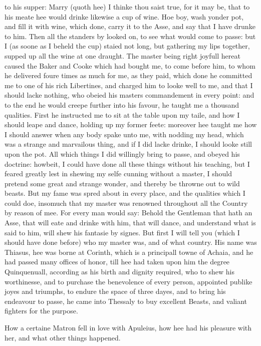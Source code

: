 to his supper: Marry (quoth hee) I thinke thou saist true, for it may be, that
to his meate hee would drinke likewise a cup of wine. Hoe boy, wash yonder pot,
and fill it with wine, which done, carry it to the Asse, and say that I have
drunke to him. Then all the standers by looked on, to see what would come to
passe: but I (as soone as I beheld the cup) staied not long, but gathering my
lips together, supped up all the wine at one draught. The master being right
joyfull hereat caused the Baker and Cooke which had bought me, to come before
him, to whom he delivered foure times as much for me, as they paid, which done
he committed me to one of his rich Libertines, and charged him to looke well to
me, and that I should lacke nothing, who obeied his masters commandement in
every point: and to the end he would creepe further into his favour, he taught
me a thousand qualities. First he instructed me to sit at the table upon my
taile, and how I should leape and dance, holding up my former feete: moreover
hee taught me how I should answer when any body spake unto me, with nodding my
head, which was a strange and marvailous thing, and if I did lacke drinke, I
should looke still upon the pot. All which things I did willingly bring to
passe, and obeyed his doctrine: howbeit, I could have done all these things
without his teaching, but I feared greatly lest in shewing my selfe cunning
without a master, I should pretend some great and strange wonder, and thereby
be throwne out to wild beasts. But my fame was spred about in every place, and
the qualities which I could doe, insomuch that my master was renowned
throughout all the Country by reason of mee. For every man would say: Behold
the Gentleman that hath an Asse, that will eate and drinke with him, that will
dance, and understand what is said to him, will shew his fantasie by signes.
But first I will tell you (which I should have done before) who my master was,
and of what country. His name was Thiasus, hee was borne at Corinth, which is a
principall towne of Achaia, and he had passed many offices of honor, till hee
had taken upon him the degree Quinquenuall, according as his birth and dignity
required, who to shew his worthinesse, and to purchase the benevolence of every
person, appointed publike joyes and triumphs, to endure the space of three
dayes, and to bring his endeavour to passe, he came into Thessaly to buy
excellent Beasts, and valiant fighters for the purpose.


How a certaine Matron fell in love with Apuleius, how hee had his pleasure with
her, and what other things happened.

